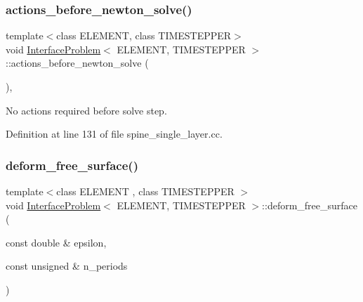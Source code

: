 \subsubsection{\texorpdfstring{actions\+\_\+before\+\_\+newton\+\_\+solve()}{actions\_before\_newton\_solve()}\hspace{0.1cm}{\footnotesize\ttfamily [2/2]}}
{\footnotesize\ttfamily template$<$class E\+L\+E\+M\+E\+NT, class T\+I\+M\+E\+S\+T\+E\+P\+P\+ER$>$ \\
void \hyperlink{classInterfaceProblem}{Interface\+Problem}$<$ E\+L\+E\+M\+E\+NT, T\+I\+M\+E\+S\+T\+E\+P\+P\+ER $>$\+::actions\+\_\+before\+\_\+newton\+\_\+solve (\begin{DoxyParamCaption}{ }\end{DoxyParamCaption})\hspace{0.3cm}{\ttfamily [inline]}, {\ttfamily [private]}}



No actions required before solve step. 



Definition at line 131 of file spine\+\_\+single\+\_\+layer.\+cc.

\mbox{\label{classInterfaceProblem_a2319232b08d9df1ab473f6cbd40939d5}} 
\subsubsection{\texorpdfstring{deform\+\_\+free\+\_\+surface()}{deform\_free\_surface()}\hspace{0.1cm}{\footnotesize\ttfamily [1/2]}}
{\footnotesize\ttfamily template$<$class E\+L\+E\+M\+E\+NT , class T\+I\+M\+E\+S\+T\+E\+P\+P\+ER $>$ \\
void \hyperlink{classInterfaceProblem}{Interface\+Problem}$<$ E\+L\+E\+M\+E\+NT, T\+I\+M\+E\+S\+T\+E\+P\+P\+ER $>$\+::deform\+\_\+free\+\_\+surface (\begin{DoxyParamCaption}\item[{const double \&}]{epsilon,  }\item[{const unsigned \&}]{n\+\_\+periods }\end{DoxyParamCaption})\hspace{0.3cm}{\ttfamily [private]}}




